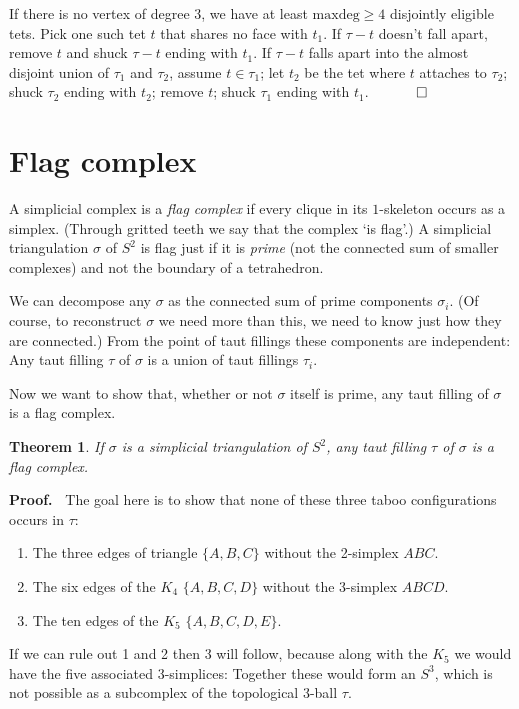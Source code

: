 \documentclass[12pt]{article}
\newtheorem{theorem}{Theorem}
\newcommand{\proofstart}{{\noindent \bf Proof.\ }}
\newcommand{\proofend}{$\quad \qed$}
\newcommand{\kw}{\mathrm}
\newcommand{\maxdeg}{\kw{maxdeg}}
\begin{document}
If there is no vertex of degree 3,
we have at least $\maxdeg \geq 4$ disjointly eligible tets.
Pick one such tet $t$ that shares no face with $t_1$.
If $\tau-t$ doesn't fall apart,
remove $t$ and shuck $\tau-t$ ending with $t_1$.
If $\tau-t$ falls apart
into the almost disjoint union of $\tau_1$ and $\tau_2$,
assume $t \in \tau_1$;
let $t_2$ be the tet where $t$ attaches to $\tau_2$;
shuck $\tau_2$ ending with $t_2$;
remove $t$;
shuck $\tau_1$ ending with $t_1$.
\proofend

\section{Flag complex}

A simplicial complex is a \emph{flag complex}
if every clique in
its $1$-skeleton occurs as a simplex.
(Through gritted teeth we say that the complex `is flag'.)
A simplicial triangulation $\sigma$ of $S^2$
is flag just if it is \emph{prime} 
(not the connected sum of smaller complexes)
and not the boundary of a tetrahedron.

We can decompose any $\sigma$ as the connected sum of
prime components $\sigma_i$.
(Of course, to reconstruct $\sigma$ we need more than this, we need to know
just how they are connected.)
From the point of taut fillings these components are independent:
Any taut filling $\tau$ of $\sigma$ is a union of taut fillings $\tau_i$.

Now we want to show that, whether or not $\sigma$ itself is prime, 
any taut filling of $\sigma$ is a flag complex.

\begin{theorem}
If $\sigma$ is a simplicial triangulation of $S^2$,
any taut filling $\tau$ of $\sigma$
is a flag complex.
\end{theorem}

\proofstart
The goal here is to show that none of these
three taboo configurations occurs
in $\tau$:
\begin{enumerate}
\item
The three edges of triangle $\{A,B,C\}$ without the 2-simplex $ABC$.
\item
The six edges of the $K_4$ $\{A,B,C,D\}$ without the 3-simplex $ABCD$.
\item
The ten edges of the $K_5$ $\{A,B,C,D,E\}$.
\end{enumerate}

If we can rule out 1 and 2 then 3 will follow, because
along with the $K_5$ we would have the five associated 3-simplices:
Together these would form an $S^3$, which is not possible as a subcomplex
of the topological 3-ball $\tau$.
\end{document}
